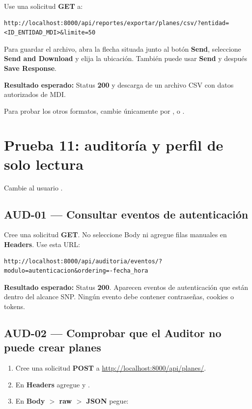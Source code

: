\documentclass[11pt,a4paper]{article}
\newcommand{\esperado}[1]{\textcolor{VerdeResultado}{\textbf{Resultado esperado:}} #1}
\begin{document}
Use una solicitud \textbf{GET} a:

\begin{lstlisting}
http://localhost:8000/api/reportes/exportar/planes/csv/?entidad=<ID_ENTIDAD_MDI>&limite=50
\end{lstlisting}

Para guardar el archivo, abra la flecha situada junto al botón \textbf{Send}, seleccione \textbf{Send and Download} y elija la ubicación. También puede usar \textbf{Send} y después \textbf{Save Response}.

\esperado{Status \textbf{200} y descarga de un archivo CSV con datos autorizados de MDI.}

Para probar los otros formatos, cambie únicamente  por ,  o .

\section{Prueba 11: auditoría y perfil de solo lectura}

Cambie al usuario .

\subsection{AUD-01 --- Consultar eventos de autenticación}

Cree una solicitud \textbf{GET}. No seleccione Body ni agregue filas manuales en \textbf{Headers}. Use esta URL:

\begin{lstlisting}
http://localhost:8000/api/auditoria/eventos/?modulo=autenticacion&ordering=-fecha_hora
\end{lstlisting}

\esperado{Status \textbf{200}. Aparecen eventos de autenticación que están dentro del alcance SNP. Ningún evento debe contener contraseñas, cookies o tokens.}

\subsection{AUD-02 --- Comprobar que el Auditor no puede crear planes}

\begin{enumerate}
  \item Cree una solicitud \textbf{POST} a \url{http://localhost:8000/api/planes/}.
  \item En \textbf{Headers} agregue  y .
  \item En \textbf{Body $>$ raw $>$ JSON} pegue:
\end{enumerate}
\end{document}
